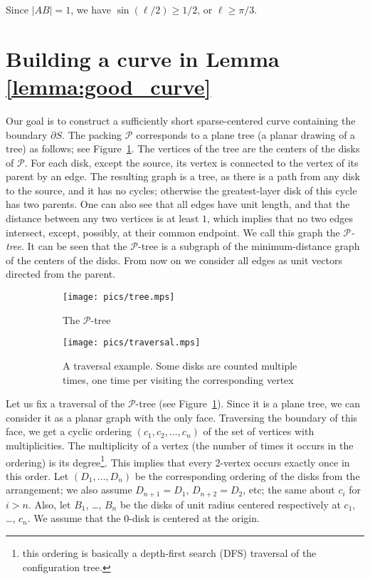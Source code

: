 Since $|AB| = 1$, we have $\sin(\ell/2)\geq 1/2$, or $\ell\geq\pi/3$.

\section{Building a curve in Lemma \ref{lemma:good_curve}}

Our goal is to construct a sufficiently short sparse-centered curve containing the boundary $\partial S$. The packing $\mathcal{P}$ corresponds to a plane tree (a planar drawing of a tree) as follows; see Figure~\ref{fig:tree}. The vertices of the tree are the centers of the disks of $\mathcal{P}$. For each disk, except the source, its vertex is connected to the vertex of its parent by an edge. The resulting graph is a tree, as there is a path from any disk to the source, and it has no cycles; otherwise the greatest-layer disk of this cycle has two parents. One can also see that all edges have unit length, and that the distance between any two vertices is at least $1$, which implies that no two edges intersect, except, possibly, at their common endpoint. We call this graph the \textit{$\mathcal{P}$-tree}. It can be seen that the $\mathcal{P}$-tree is a subgraph of the minimum-distance graph of the centers of the disks. From now on we consider all edges as unit vectors directed from the parent.

\begin{figure}[h!]
    \centering
    \begin{subfigure}[t]{.48\textwidth}
    \texttt{[image: pics/tree.mps]}
    \caption{The $\mathcal{P}$-tree}
    \end{subfigure}
    \begin{subfigure}[t]{.48\textwidth}
    \texttt{[image: pics/traversal.mps]}
    \caption{A traversal example. Some disks are counted multiple times, one time per visiting the corresponding vertex}
    \end{subfigure}
    \caption{}
    \label{fig:tree}
\end{figure}

Let us fix a traversal of the $\mathcal{P}$-tree (see Figure~\ref{fig:tree}). 
Since it is a plane tree, we can consider it as a planar graph with the only face. Traversing the boundary of this face, we get a cyclic ordering $(c_1, c_2, \ldots, c_n)$ of the set of vertices with multiplicities. The multiplicity of a vertex (the number of times it occurs in the ordering) is its degree\footnote{this ordering is basically a depth-first search (DFS) traversal of the configuration tree.}.
This implies that every 2-vertex occurs exactly once in this order.
Let $(D_1, \ldots, D_n)$ be the corresponding ordering of the disks from the arrangement; we also assume $D_{n+1} = D_1$, $D_{n+2} = D_2$, etc; the same about $c_i$ for $i > n$. Also, let $B_1$, \ldots, $B_n$ be the disks of unit radius centered respectively at $c_1$, \ldots, $c_n$. %
We assume that the $0$-disk is centered at the origin.

